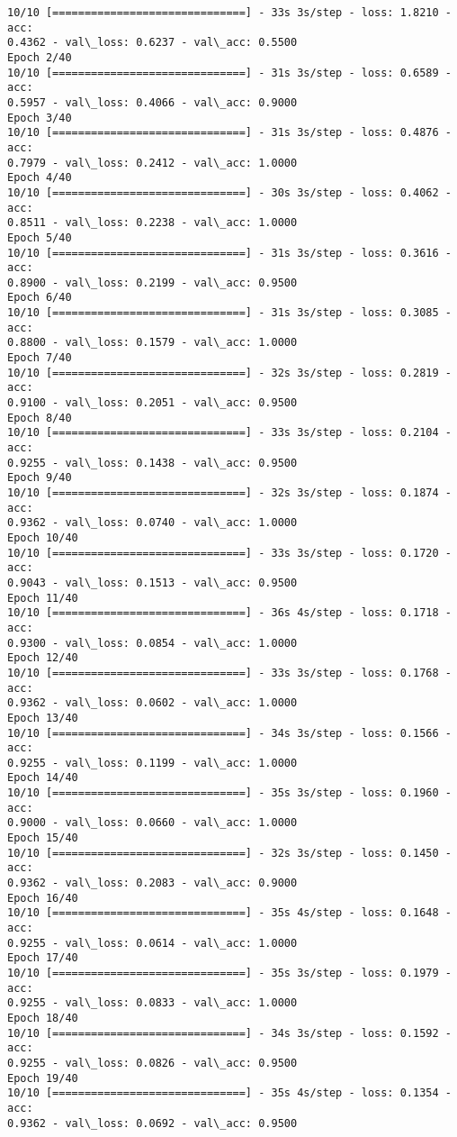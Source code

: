 \documentclass[11pt]{article}
\begin{document}
    \begin{Verbatim}[commandchars=\\\{\}]
10/10 [==============================] - 33s 3s/step - loss: 1.8210 - acc:
0.4362 - val\_loss: 0.6237 - val\_acc: 0.5500
Epoch 2/40
10/10 [==============================] - 31s 3s/step - loss: 0.6589 - acc:
0.5957 - val\_loss: 0.4066 - val\_acc: 0.9000
Epoch 3/40
10/10 [==============================] - 31s 3s/step - loss: 0.4876 - acc:
0.7979 - val\_loss: 0.2412 - val\_acc: 1.0000
Epoch 4/40
10/10 [==============================] - 30s 3s/step - loss: 0.4062 - acc:
0.8511 - val\_loss: 0.2238 - val\_acc: 1.0000
Epoch 5/40
10/10 [==============================] - 31s 3s/step - loss: 0.3616 - acc:
0.8900 - val\_loss: 0.2199 - val\_acc: 0.9500
Epoch 6/40
10/10 [==============================] - 31s 3s/step - loss: 0.3085 - acc:
0.8800 - val\_loss: 0.1579 - val\_acc: 1.0000
Epoch 7/40
10/10 [==============================] - 32s 3s/step - loss: 0.2819 - acc:
0.9100 - val\_loss: 0.2051 - val\_acc: 0.9500
Epoch 8/40
10/10 [==============================] - 33s 3s/step - loss: 0.2104 - acc:
0.9255 - val\_loss: 0.1438 - val\_acc: 0.9500
Epoch 9/40
10/10 [==============================] - 32s 3s/step - loss: 0.1874 - acc:
0.9362 - val\_loss: 0.0740 - val\_acc: 1.0000
Epoch 10/40
10/10 [==============================] - 33s 3s/step - loss: 0.1720 - acc:
0.9043 - val\_loss: 0.1513 - val\_acc: 0.9500
Epoch 11/40
10/10 [==============================] - 36s 4s/step - loss: 0.1718 - acc:
0.9300 - val\_loss: 0.0854 - val\_acc: 1.0000
Epoch 12/40
10/10 [==============================] - 33s 3s/step - loss: 0.1768 - acc:
0.9362 - val\_loss: 0.0602 - val\_acc: 1.0000
Epoch 13/40
10/10 [==============================] - 34s 3s/step - loss: 0.1566 - acc:
0.9255 - val\_loss: 0.1199 - val\_acc: 1.0000
Epoch 14/40
10/10 [==============================] - 35s 3s/step - loss: 0.1960 - acc:
0.9000 - val\_loss: 0.0660 - val\_acc: 1.0000
Epoch 15/40
10/10 [==============================] - 32s 3s/step - loss: 0.1450 - acc:
0.9362 - val\_loss: 0.2083 - val\_acc: 0.9000
Epoch 16/40
10/10 [==============================] - 35s 4s/step - loss: 0.1648 - acc:
0.9255 - val\_loss: 0.0614 - val\_acc: 1.0000
Epoch 17/40
10/10 [==============================] - 35s 3s/step - loss: 0.1979 - acc:
0.9255 - val\_loss: 0.0833 - val\_acc: 1.0000
Epoch 18/40
10/10 [==============================] - 34s 3s/step - loss: 0.1592 - acc:
0.9255 - val\_loss: 0.0826 - val\_acc: 0.9500
Epoch 19/40
10/10 [==============================] - 35s 4s/step - loss: 0.1354 - acc:
0.9362 - val\_loss: 0.0692 - val\_acc: 0.9500

\end{Verbatim}
\end{document}
